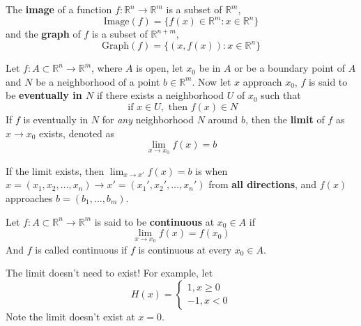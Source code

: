 \documentclass[openany]{book}
\newcommand{\R}{\mathbb{R}}
\begin{document}
\begin{defn}[graph]
    The \textbf{image} of a function $f: \R^n\to\R^m$ is a subset of $\R^m$,
    \begin{equation*}
        \text{Image}(f)=\{f(x)\in\R^m: x\in\R^n\}
    \end{equation*}
    and the \textbf{graph} of $f$ is a subset of $\R^{n+m}$,
    \begin{equation*}
        \text{Graph}(f)=\{(x,f(x)): x\in\R^n\}
    \end{equation*}
\end{defn}



\begin{defn}[limit]
    Let $f: A\subset\R^n\to\R^m$, where $A$ is open, let $x_0$ be in $A$ or be a boundary point of $A$ and $N$ be a neighborhood of a point $b\in\R^m$. Now let $x$ approach $x_0$, $f$ is said to be \textbf{eventually in $N$} if there exists a neighborhood $U$ of $x_0$ such that 
    \begin{equation*}
        \text{ if } x\in U, \text{ then } f(x)\in N
    \end{equation*}
    If $f$ is eventually in $N$ for \textit{any} neighborhood $N$ around $b$, then the \textbf{limit} of $f$ as $x\to x_0$ exists, denoted as 
    \begin{equation*}
        \lim_{x\to x_0}f(x)=b
    \end{equation*}
\end{defn}

\begin{defn}[limit']
    If the limit exists, then $\lim_{x\to x'}f(x)=b$ is when $x=(x_1, x_2, \dots, x_n)\to x'=(x_1',x_2',\dots, x_n')$ from \textbf{all directions}, and $f(x)$ approaches $b=(b_1,\dots, b_m)$.
\end{defn}



\begin{defn}[continuity]
    Let $f:A\subset\R^n\to\R^m$ is said to be \textbf{continuous} at $x_0\in A$ if 
    \begin{equation*}
        \lim_{x\to x_0}f(x)=f(x_0)
    \end{equation*}
    And $f$ is called continuous if $f$ is continuous at every $x_0\in A$.
\end{defn}

\begin{example}
    The limit doesn't need to exist! For example, let 
    \begin{equation*}
        H(x)=\begin{cases}
            1, x\geq 0\\
            -1, x<0
        \end{cases}
    \end{equation*}
    Note the limit doesn't exist at $x=0$.
\end{example}
\end{document}
